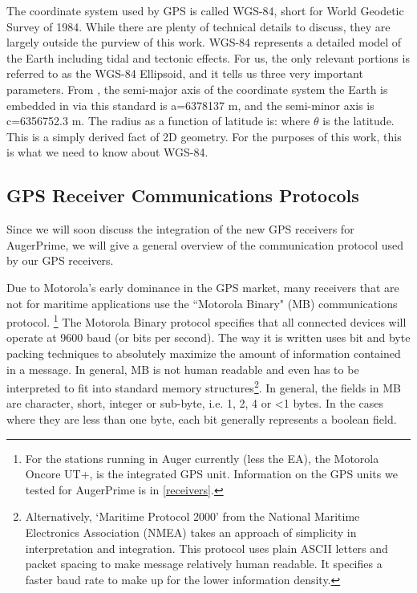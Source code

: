 The coordinate system used by GPS is called WGS-84, short for World Geodetic Survey of 1984. While there are plenty of technical details to discuss, they are largely outside the purview of this work. WGS-84 represents a detailed model of the Earth including tidal and tectonic effects. For us, the only relevant portions is referred to as the WGS-84 Ellipsoid, and it tells us three very important parameters. From \textcite{wgs84}, the semi-major axis of the coordinate system the Earth is embedded in via this standard is a=6378137 m, and the semi-minor axis is c=6356752.3 m. The radius as a function of latitude is:
where $\theta$ is the latitude. This is a simply derived fact of 2D geometry. For the purposes of this work, this is what we need to know about WGS-84.

\subsection{GPS Receiver Communications Protocols}
\label{m12mcomm}
Since we will soon discuss the integration of the new GPS receivers for AugerPrime, we will give a general overview of the communication protocol used by our GPS receivers. 

Due to Motorola's early dominance in the GPS market, many receivers that are not for maritime applications use the ``Motorola Binary" (MB) communications protocol. \footnote{For the stations running in Auger currently (less the EA), the Motorola Oncore UT+, is the integrated GPS unit. Information on the GPS units we tested for AugerPrime is in \autoref{receivers}.} The Motorola Binary protocol specifies that all connected devices will operate at 9600 baud (or bits per second). The way it is written uses bit and byte packing techniques to absolutely maximize the amount of information contained in a message. In general, MB is not human readable and even has to be interpreted to fit into standard memory structures\footnote{Alternatively, `Maritime Protocol 2000' from the National Maritime Electronics Association (NMEA) takes an approach of simplicity in interpretation and integration. This protocol uses plain ASCII letters and packet spacing to make message relatively human readable. It specifies a faster baud rate to make up for the lower information density.}. In general, the fields in MB are character, short, integer or sub-byte, i.e. 1, 2, 4 or \textless 1 bytes. In the cases where they are less than one byte, each bit generally represents a boolean field. 

